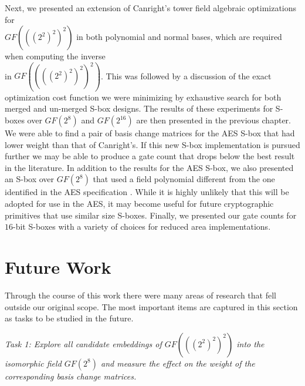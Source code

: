 Next, we presented an extension of Canright's tower field algebraic optimizations for \\ $GF(((2^2)^2)^2)$ in both polynomial and normal bases, which are required when computing the inverse \\ in $GF((((2^2)^2)^2)^2)$. This was followed by a discussion of the exact optimization cost function we were minimizing by exhaustive search for both merged and un-merged S-box designs. The results of these experiments for S-boxes over $GF(2^8)$ and $GF(2^{16})$ are then presented in the previous chapter. We were able to find a pair of basis change matrices for the AES S-box that had lower weight than that of Canright's. If this new S-box implementation is pursued further we may be able to produce a gate count that drops below the best result in the literature. In addition to the results for the AES S-box, we also presented an S-box over $GF(2^8)$ that used a field polynomial different from the one identified in the AES specification \cite{daemen01-AES}. While it is highly unlikely that this will be adopted for use in the AES, it may become useful for future cryptographic primitives that use similar size S-boxes. Finally, we presented our gate counts for $16$-bit S-boxes with a variety of choices for reduced area implementations. 

\section{Future Work}
Through the course of this work there were many areas of research that fell outside our original scope. The most important items are captured in this section as tasks to be studied in the future.

\vspace*{1em}
\begin{minipage}{.9\textwidth}
  \emph{Task 1: Explore all candidate embeddings of $GF(((2^2)^2)^2)$ into the isomorphic field $GF(2^8)$ and measure the effect on the weight of the corresponding basis change matrices.}
\end{minipage}
\vspace*{1em}

